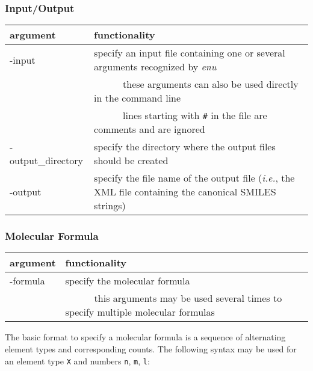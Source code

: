 \documentclass[a4paper,11pt]{article}
\newcommand{\tabitem}{~~\llap{\textbullet}~~}
\begin{document}
\subsubsection{Input/Output}
\begin{table}[H]
\begin{tabular}{>{\ttfamily}p{}|p{}}
    \hline
    \textnormal{argument} & functionality                                                                                  \\
    \hline\hline
    -input   & specify an input file containing one or several arguments recognized by \textit{enu}                   \\
             & ~~\tabitem these arguments can also be used directly in the command line                       \\
             & ~~\tabitem lines starting with \texttt{\#} in the file are comments and are ignored \\
    \hline
    -output\_directory & specify the directory where the output files should be created \\
    \hline
    -output & specify the file name of the output file (\textit{i.e.}, the XML file containing the canonical SMILES strings)\\
    \hline
\end{tabular}
\end{table}

\subsubsection{Molecular Formula}

\begin{table}[H]
\begin{tabular}{>{\ttfamily}p{}|p{}}
    \hline
    \textnormal{argument} & functionality                                                                                  \\
    \hline\hline
    -formula & specify the molecular formula \\
             & ~~\tabitem this arguments may be used several times to specify multiple molecular formulas \\
    \hline
\end{tabular}
\end{table}

The basic format to specify a molecular formula is a sequence of alternating element types and corresponding counts. The following syntax may be used for an element type \texttt{X} and numbers \texttt{n}, \texttt{m}, \texttt{l}:
\end{document}
